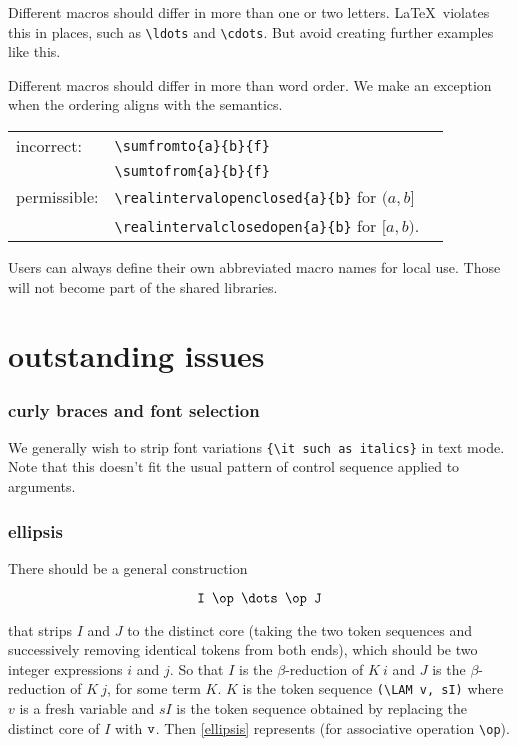 \documentclass[12pt]{amsart}
\begin{document}
Different macros should differ in more than one or two letters.
\LaTeX\ violates this in places, such as \verb!\ldots! and \verb!\cdots!.
But avoid creating further examples like this.

Different macros should differ in more than word order.
We make an exception when the ordering aligns with the semantics.

\begin{tabular}{lll}
 incorrect: &\verb!\sumfromto{a}{b}{f}!\\ &\verb!\sumtofrom{a}{b}{f}!\\
 permissible: &\verb!\realintervalopenclosed{a}{b}! for $(a,b]$\\
    &\verb!\realintervalclosedopen{a}{b}! for $[a,b)$.
\end{tabular} 

Users can always define their own abbreviated macro names for local use.
Those will not become part of the shared libraries.


\section{outstanding issues}



\subsubsection{curly braces and font selection}



We generally wish to strip font variations \verb!{\it such as italics}! in
text mode.  Note that this doesn't fit the usual pattern of control sequence applied
to arguments.




\subsubsection{ellipsis}

There should be a general construction 

\begin{equation}\label{ellipsis}
\verb!I \op \dots \op J!   
\end{equation}

that strips $I$ and $J$ to the distinct core (taking the two token sequences and successively removing identical tokens from
both ends), which should be two integer expressions $i$ and $j$.
So that $I$ is the $\beta$-reduction of $K\ i$ and $J$ is the $\beta$-reduction of $K\ j$, for some
term $K$.  $K$ is the token sequence  \verb!(\LAM v, sI)! where $v$ is a fresh variable and $sI$ is the token sequence
obtained by replacing the distinct core of $I$ with $\verb!v!$.
Then \eqref{ellipsis} represents (for associative operation \verb!\op!).
\end{document}
